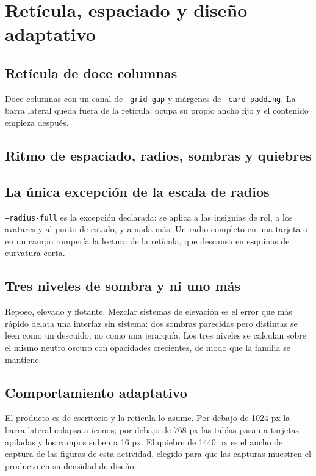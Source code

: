 \section{Retícula, espaciado y diseño adaptativo}

\subsection{Retícula de doce columnas}

Doce columnas con un canal de \texttt{--grid-gap} y márgenes de \texttt{--card-padding}. La barra lateral queda fuera de la retícula: ocupa su propio ancho fijo y el contenido empieza después.

\subsection{Ritmo de espaciado, radios, sombras y quiebres}

\laminaReticula

\subsection{La única excepción de la escala de radios}

\texttt{--radius-full} es la excepción declarada: se aplica a las insignias de rol, a los avatares y al punto de estado, y a nada más. Un radio completo en una tarjeta o en un campo rompería la lectura de la retícula, que descansa en esquinas de curvatura corta.

\subsection{Tres niveles de sombra y ni uno más}

Reposo, elevado y flotante. Mezclar sistemas de elevación es el error que más rápido delata una interfaz sin sistema: dos sombras parecidas pero distintas se leen como un descuido, no como una jerarquía. Los tres niveles se calculan sobre el mismo neutro oscuro con opacidades crecientes, de modo que la familia se mantiene.

\subsection{Comportamiento adaptativo}

El producto es de escritorio y la retícula lo asume. Por debajo de 1024 px la barra lateral colapsa a iconos; por debajo de 768 px las tablas pasan a tarjetas apiladas y los campos suben a 16 px. El quiebre de 1440 px es el ancho de captura de las figuras de esta actividad, elegido para que las capturas muestren el producto en su densidad de diseño.

